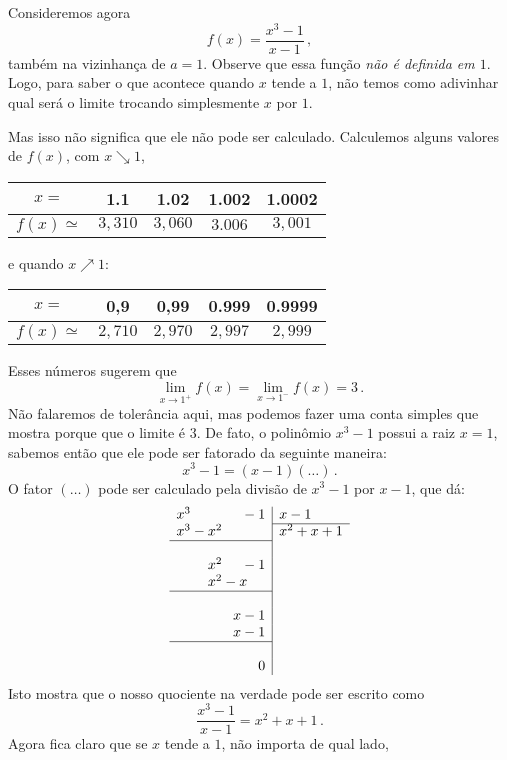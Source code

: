 \begin{ex}\label{Ex:primeironaotrivial} Consideremos agora 
\[f(x)=\frac{x^3-1}{x-1}\,,\]
também na vizinhança de $a=1$.
Observe que essa função \emph{não é definida em $1$}. Logo, 
para saber o que acontece quando $x$ tende a $1$, não
temos como adivinhar qual será o limite trocando simplesmente $x$ por $1$.

Mas isso não significa que ele não pode ser calculado. Calculemos alguns valores 
de $f(x)$, com $x\searrow 1$,
\begin{center}
\begin{tabular}{c|c|c|c|c}
$x=$&1.1&1.02&1.002&1.0002\\
\hline
$f(x)\simeq $&$3,310$&$3,060$&$3.006$&$3,001$
\end{tabular}
\end{center}
e quando $x\nearrow 1$:
\begin{center}
\begin{tabular}{c|c|c|c|c}
$x=$&0,9&0,99&0.999&0.9999\\
\hline
$f(x)\simeq $&$2,710$&$2,970$&$2,997$&$2,999$
\end{tabular}
\end{center}
Esses números sugerem que
\[\lim_{x\to 1^+}f(x)=\lim_{x\to 1^-}f(x)=3\,.\] 
Não falaremos de tolerância aqui, mas podemos 
fazer uma conta simples que mostra porque que o limite é $3$.
De fato, o polinômio $x^3-1$ possui a raiz $x=1$, sabemos então 
que ele pode ser fatorado da seguinte maneira:
\[ x^3-1=(x-1)(\dots)\,.
\]
O fator $(\dots)$ pode ser calculado pela divisão de $x^3-1$ por $x-1$,
que dá:
\[
\begin{array}{r|l}
x^3 \phantom{+x^2+x}-1 & x-1 \\ \cline{2-2}
x^3-x^2\phantom{+x+1} & x^2+x+1 \\ \cline{1-1} \\
x^2\phantom{+x}-1 \\
   x^2-x\phantom{-1} \\ \cline{1-1} \\
                       x - 1\\
		       x-1 \\\cline{1-1}\\
		       0
  \end{array}
\]
Isto mostra que o nosso quociente na verdade pode ser escrito como
$$\frac{x^3-1}{x-1}=x^2+x+1\,.$$
Agora fica claro que se $x$ tende a $1$, não importa de qual lado, 
\end{ex}

